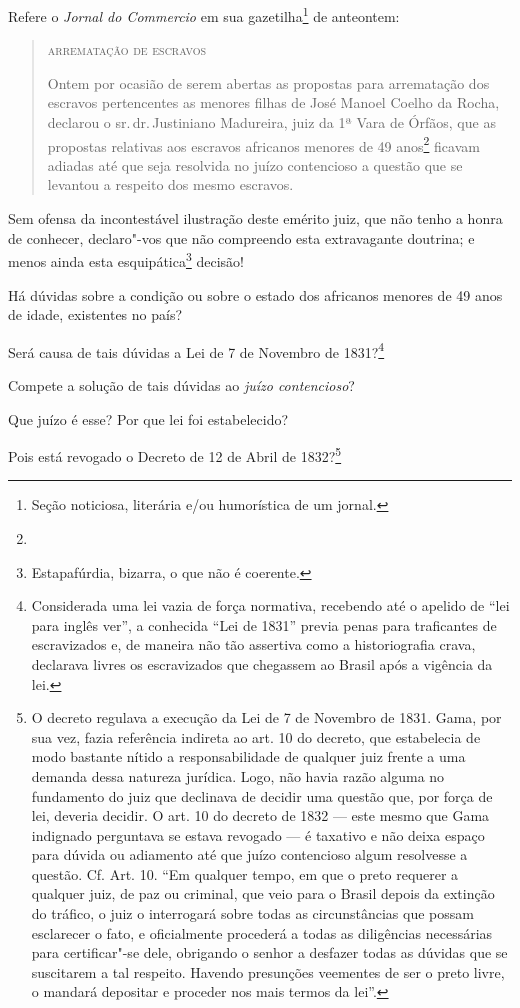 Refere o \emph{Jornal do Commercio} em sua gazetilha\footnote{Seção
  noticiosa, literária e/ou humorística de um jornal.} de anteontem:

\begin{quote}
\textsc{arrematação de escravos}

Ontem por ocasião de serem abertas as propostas para arrematação dos
escravos pertencentes as menores filhas de José Manoel Coelho da Rocha,
declarou o sr.\,dr.\,Justiniano Madureira, juiz da 1ª Vara de Órfãos, que
as propostas relativas aos escravos africanos menores de 49
anos\footnote{} ficavam adiadas até que seja resolvida no juízo
contencioso a questão que se levantou a respeito dos mesmo escravos.
\end{quote}

Sem ofensa da incontestável ilustração deste emérito juiz, que não tenho
a honra de conhecer, declaro"-vos que não compreendo esta extravagante
doutrina; e menos ainda esta esquipática\footnote{Estapafúrdia,
  bizarra, o que não é coerente.} decisão!

Há dúvidas sobre a condição ou sobre o estado dos africanos menores de
49 anos de idade, existentes no país?

Será causa de tais dúvidas a Lei de 7 de Novembro de 1831?\footnote{
  Considerada uma lei vazia de força normativa, recebendo até o apelido
  de ``lei para inglês ver'', a conhecida ``Lei de 1831'' previa penas para
  traficantes de escravizados e, de maneira não tão assertiva como a
  historiografia crava, declarava livres os escravizados que chegassem
  ao Brasil após a vigência da lei.}

Compete a solução de tais dúvidas ao \emph{juízo contencioso}?

Que juízo é esse? Por que lei foi estabelecido?

Pois está revogado o Decreto de 12 de Abril de 1832?\footnote{O
  decreto regulava a execução da Lei de 7 de Novembro de 1831. Gama, por
  sua vez, fazia referência indireta ao art. 10 do decreto, que
  estabelecia de modo bastante nítido a responsabilidade de qualquer
  juiz frente a uma demanda dessa natureza jurídica. Logo, não havia
  razão alguma no fundamento do juiz que declinava de decidir uma
  questão que, por força de lei, deveria decidir. O art. 10 do decreto
  de 1832 --- este mesmo que Gama indignado perguntava se estava revogado
  --- é taxativo e não deixa espaço para dúvida ou adiamento até que juízo
  contencioso algum resolvesse a questão. Cf. Art. 10. ``Em qualquer
  tempo, em que o preto requerer a qualquer juiz, de paz ou criminal,
  que veio para o Brasil depois da extinção do tráfico, o juiz o
  interrogará sobre todas as circunstâncias que possam esclarecer o
  fato, e oficialmente procederá a todas as diligências necessárias para
  certificar"-se dele, obrigando o senhor a desfazer todas as dúvidas que
  se suscitarem a tal respeito. Havendo presunções veementes de ser o
  preto livre, o mandará depositar e proceder nos mais termos da lei''.}

